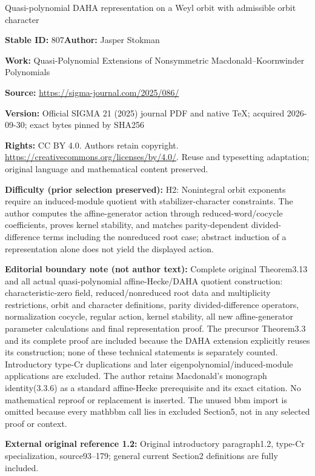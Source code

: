\documentclass[11pt]{article}
\numberwithin{equation}{section}
\numberwithin{equation}{section}
\begin{document}
\begin{center}\Large Quasi-polynomial DAHA representation on a Weyl orbit with admissible orbit character\end{center}
\noindent\textbf{Stable ID:} 807\quad\textbf{Author:} Jasper Stokman\par
\noindent\textbf{Work:} Quasi-Polynomial Extensions of Nonsymmetric Macdonald–Koornwinder Polynomials\par
\noindent\textbf{Source:} \url{https://sigma-journal.com/2025/086/}\par
\noindent\textbf{Version:} Official SIGMA 21 (2025) journal PDF and native TeX; acquired 2026-09-30; exact bytes pinned by SHA256\par
\noindent\textbf{Rights:} CC BY 4.0. Authors retain copyright. \url{https://creativecommons.org/licenses/by/4.0/}. Reuse and typesetting adaptation; original language and mathematical content preserved.\par
\noindent\textbf{Difficulty (prior selection preserved):} {\CJKfont H2: Nonintegral orbit exponents require an induced-module quotient with stabilizer-character constraints. The author computes the affine-generator action through reduced-word/cocycle coefficients, proves kernel stability, and matches parity-dependent divided-difference terms including the nonreduced root case; abstract induction of a representation alone does not yield the displayed action.}\par
\medskip\noindent\textbf{Editorial boundary note (not author text):} Complete original Theorem3.13 and all actual quasi-polynomial affine-Hecke/DAHA quotient construction: characteristic-zero field, reduced/nonreduced root data and multiplicity restrictions, orbit and character definitions, parity divided-difference operators, normalization cocycle, regular action, kernel stability, all new affine-generator parameter calculations and final representation proof. The precursor Theorem3.3 and its complete proof are included because the DAHA extension explicitly reuses its construction; none of these technical statements is separately counted. Introductory type-Cr duplications and later eigenpolynomial/induced-module applications are excluded. The author retains Macdonald’s monograph identity(3.3.6) as a standard affine-Hecke prerequisite and its exact citation. No mathematical reproof or replacement is inserted. The unused bbm import is omitted because every mathbbm call lies in excluded Section5, not in any selected proof or context.\par
\noindent\textbf{External original reference 1.2:} Original introductory paragraph1.2, type-Cr specialization, source93–179; general current Section2 definitions are fully included.\par
\end{document}
